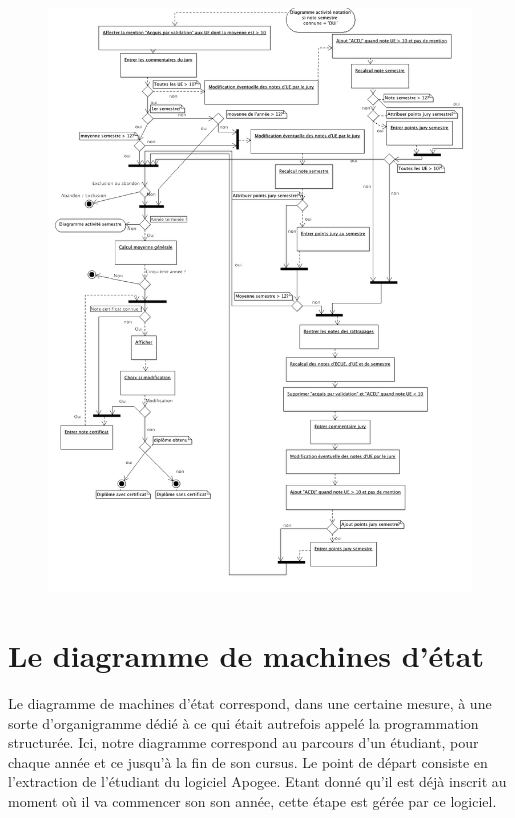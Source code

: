 \documentclass[letter, 11pt] {article}
\begin{document}
		
		\begin{figure}[htbp]
				\includegraphics[scale = 0.4]{../Diagramme_activite/Diagramme_jury.png}
		\end{figure}
		
		\newpage
	
	\section{Le diagramme de machines d'état}
	
	Le diagramme de machines d'état correspond, dans une certaine mesure, à une sorte d'organigramme dédié à ce qui était autrefois appelé la programmation structurée. Ici, notre diagramme correspond au parcours d'un étudiant, pour chaque année et ce jusqu'à la fin de son cursus.
	Le point de départ consiste en l'extraction de l'étudiant du logiciel Apogee. Etant donné qu'il est déjà inscrit au moment où il va commencer son son année, cette étape est gérée par ce logiciel.
\end{document}
